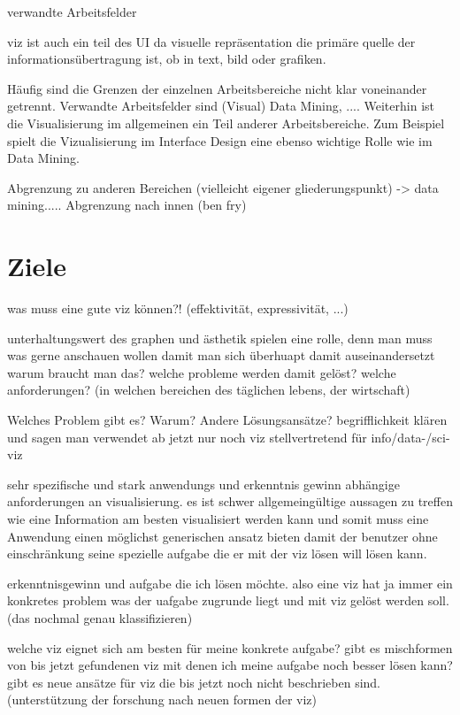 \documentclass[a4paper, 12pt, DIVcalc, onepage, pdftex, headsepline, footsepline]{scrreprt}
\begin{document}
verwandte Arbeitsfelder

viz ist auch ein teil des UI da visuelle repräsentation die primäre quelle der informationsübertragung ist, ob in text, bild oder grafiken.

Häufig sind die Grenzen der einzelnen Arbeitsbereiche nicht klar voneinander getrennt. Verwandte Arbeitsfelder sind (Visual) Data Mining, ....
Weiterhin ist die Visualisierung im allgemeinen ein Teil anderer Arbeitsbereiche. Zum Beispiel spielt die Vizualisierung im Interface Design eine ebenso wichtige Rolle wie im Data Mining.

Abgrenzung zu anderen Bereichen (vielleicht eigener gliederungspunkt) -> data mining.....
Abgrenzung nach innen (ben fry)

\section{Ziele}
\label{sec:Ziele}
was muss eine gute viz können?! (effektivität, expressivität, ...)

unterhaltungswert des graphen und ästhetik spielen eine rolle, denn man muss was gerne anschauen wollen damit man sich überhuapt damit auseinandersetzt
warum braucht man das? welche probleme werden damit gelöst?
welche anforderungen? (in welchen bereichen des täglichen lebens, der wirtschaft)

Welches Problem gibt es?
Warum?
Andere Lösungsansätze?
begrifflichkeit klären und sagen man verwendet ab jetzt nur noch viz stellvertretend für info/data-/sci-viz

sehr spezifische und stark anwendungs und erkenntnis gewinn abhängige anforderungen an visualisierung. 
es ist schwer allgemeingültige aussagen zu treffen wie eine Information am besten visualisiert werden kann und somit muss eine Anwendung einen möglichst generischen ansatz bieten damit der benutzer ohne einschränkung seine spezielle aufgabe die er mit der viz lösen will lösen kann.

erkenntnisgewinn und aufgabe die ich lösen möchte. also eine viz hat ja immer ein konkretes problem was der uafgabe zugrunde liegt und mit viz gelöst werden soll. (das nochmal genau klassifizieren)

welche viz eignet sich am besten für meine konkrete aufgabe?
gibt es mischformen von bis jetzt gefundenen viz mit denen ich meine aufgabe noch besser lösen kann?
gibt es neue ansätze für viz die bis jetzt noch nicht beschrieben sind. (unterstützung der forschung nach neuen formen der viz)
\end{document}

